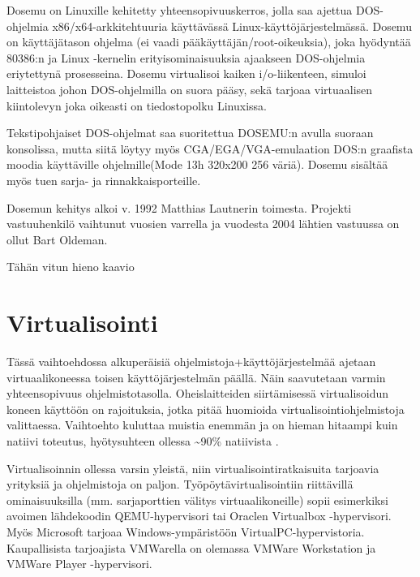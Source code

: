 \documentclass[11pt,a4paper,oneside,article]{memoir}
\begin{document}
Dosemu on Linuxille kehitetty yhteensopivuuskerros, jolla saa ajettua DOS-ohjelmia x86/x64-arkkitehtuuria käyttävässä Linux-käyttöjärjestelmässä. Dosemu on käyttäjätason ohjelma (ei vaadi pääkäyttäjän/root-oikeuksia), joka hyödyntää 80386:n ja Linux -kernelin erityisominaisuuksia ajaakseen DOS-ohjelmia eriytettynä prosesseina. Dosemu virtualisoi kaiken i/o-liikenteen, simuloi laitteistoa johon DOS-ohjelmilla on suora pääsy, sekä tarjoaa virtuaalisen kiintolevyn joka oikeasti on tiedostopolku Linuxissa.

Tekstipohjaiset DOS-ohjelmat saa suoritettua DOSEMU:n avulla suoraan konsolissa, mutta siitä löytyy myös CGA/EGA/VGA-emulaation DOS:n graafista moodia käyttäville ohjelmille(Mode 13h 320x200 256 väriä). Dosemu sisältää myös tuen sarja- ja rinnakkaisporteille.

Dosemun kehitys alkoi v. 1992 Matthias Lautnerin toimesta. Projekti vastuuhenkilö vaihtunut vuosien varrella ja vuodesta 2004 lähtien vastuussa on ollut Bart Oldeman.

\lipsum[1-3]

Tähän vitun hieno kaavio



\section{Virtualisointi}

Tässä vaihtoehdossa alkuperäisiä ohjelmistoja+käyttöjärjestelmää ajetaan virtuaalikoneessa toisen käyttöjärjestelmän päällä. Näin saavutetaan varmin yhteensopivuus ohjelmistotasolla. Oheislaitteiden siirtämisessä virtualisoidun koneen käyttöön on rajoituksia, jotka pitää huomioida virtualisointiohjelmistoja valittaessa. Vaihtoehto kuluttaa muistia enemmän ja on hieman hitaampi kuin natiivi toteutus, hyötysuhteen ollessa \textasciitilde{}90\%  natiivista \cite{virtnat_anadtech}. 

Virtualisoinnin ollessa varsin yleistä, niin virtualisointiratkaisuita tarjoavia yrityksiä ja ohjelmistoja on paljon. Työpöytävirtualisointiin riittävillä ominaisuuksilla (mm. sarjaporttien välitys virtuaalikoneille) sopii esimerkiksi avoimen lähdekoodin QEMU-hypervisori tai Oraclen Virtualbox -hypervisori. Myös Microsoft tarjoaa Windows-ympäristöön VirtualPC-hypervistoria. Kaupallisista tarjoajista VMWarella on olemassa VMWare Workstation ja VMWare Player -hypervisori.

\end{document}
